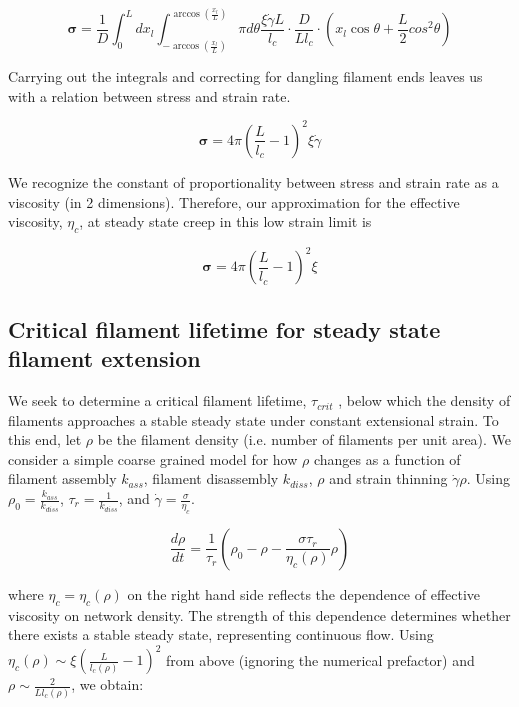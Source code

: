 \documentclass[10pt,letterpaper]{article}
\begin{document}
\begin{equation}
\mathbf{\sigma} =  \frac{1}{D} \int_0^L dx_l \int_{-\arccos (\frac{x_l}{L})}^{\arccos (\frac{x_l}{L})}\pi d\theta \frac{\xi \dot \gamma L}{l_c} \cdot \frac{D}{Ll_c}\cdot (x_l \cos \theta + \frac{L}{2} cos^2\theta)
\end{equation}

Carrying out the integrals and correcting for dangling filament ends leaves us with a relation between stress and strain rate.

\begin{equation}
\mathbf{\sigma} = 4 \pi \left ( \frac{ L}{l_c}-1 \right)^2 \xi \dot \gamma 
\end{equation}

We recognize the constant of proportionality between stress and strain rate as a viscosity (in 2 dimensions).  Therefore, our approximation for the effective viscosity, $\eta_{c}$, at steady state creep in this low strain limit is

\begin{equation}
\label{lin_eqn}
\mathbf{\sigma} = 4 \pi \left ( \frac{ L}{l_c}-1 \right)^2 \xi
\end{equation}



\subsection{Critical filament lifetime for steady state filament extension}
We seek to determine a critical filament lifetime, $\tau_{crit}$ , below which the density of filaments approaches a stable steady state under constant extensional strain. To this end, let $\rho$ be the filament density (i.e. number of filaments per unit area). We consider a simple coarse grained model for how $\rho$ changes as a function of filament assembly $k_{ass}$, filament disassembly $k_{diss}$, $\rho$ and strain thinning $\dot{\gamma}\rho$. Using $\rho_0 = \frac{k_{ass}}{k_{diss}}$, $\tau_r=\frac{1}{k_{diss}}$, and $\dot{\gamma}=\frac{\sigma}{\eta_c}$.

\begin{equation}
\label{drho_1}
\frac{d\rho}{dt}=\frac{1}{\tau_r}\left ( \rho_0 - \rho - \frac{\sigma \tau_r}{\eta_c(\rho)} \rho\right )
\end{equation}

where $\eta_c = \eta_c(\rho)$ on the right hand side reflects the dependence of effective viscosity on network density.  The strength of this dependence determines whether there exists a stable steady state, representing continuous flow.  Using $\eta_c(\rho)\sim \xi \left ( \frac{L}{l_c(\rho)} -1 \right )^2$ from above (ignoring the numerical prefactor) and $\rho \sim \frac{2}{L l_c(\rho)}$, we obtain:
\end{document}
